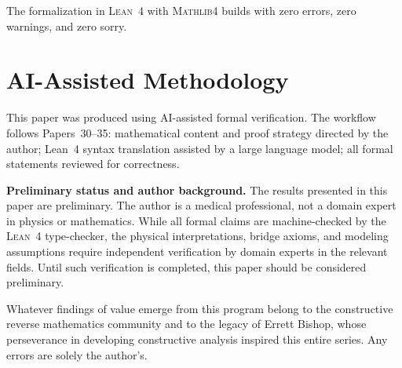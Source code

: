 \documentclass[11pt,a4paper]{article}
\theoremstyle{plain}
\theoremstyle{definition}
\newcommand{\Lean}{\textsc{Lean~4}}
\newcommand{\Mathlib}{\textsc{Mathlib4}}
\begin{document}
The formalization in \Lean{} with \Mathlib{} builds with zero
errors, zero warnings, and zero sorry.

\section{AI-Assisted Methodology}\label{sec:ai}

This paper was produced using AI-assisted formal verification.
The workflow follows Papers~30--35: mathematical content and proof
strategy directed by the author; Lean~4 syntax translation assisted
by a large language model; all formal statements reviewed for
correctness.

\medskip\noindent
\textbf{Preliminary status and author background.}
The results presented in this paper are preliminary.  The author is a medical
professional, not a domain expert in physics or mathematics.  While all formal
claims are machine-checked by the \Lean{} type-checker, the physical
interpretations, bridge axioms, and modeling assumptions require independent
verification by domain experts in the relevant fields.  Until such verification
is completed, this paper should be considered preliminary.

\medskip\noindent
Whatever findings of value emerge from this program belong to the
constructive reverse mathematics community and to the legacy of Errett Bishop,
whose perseverance in developing constructive analysis inspired this entire
series.  Any errors are solely the author's.
\end{document}
